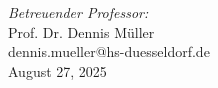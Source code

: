 \begin{titlepage}
\begin{center}
        \textit{Betreuender Professor:} \\
        Prof. Dr. Dennis Müller\\
        dennis.mueller@hs-duesseldorf.de \\[2cm]

        August 27, 2025%
    \end{center}

    \vspace{3cm} %


\end{titlepage}

